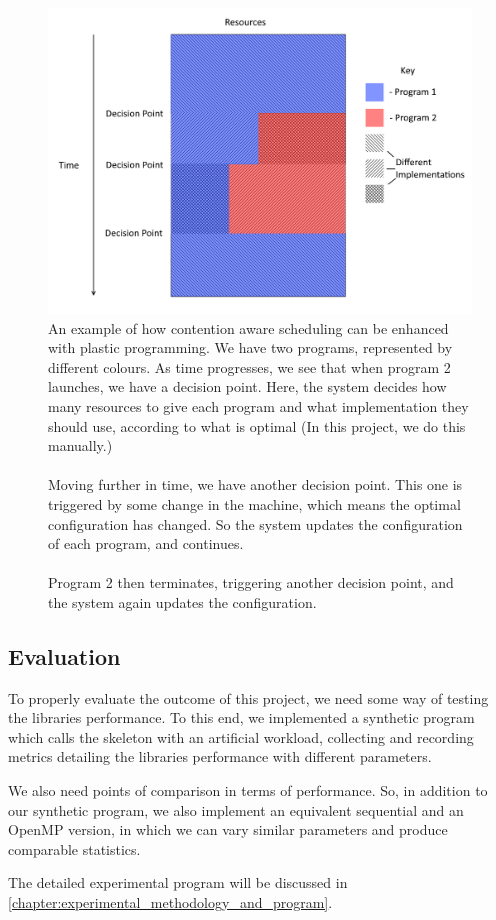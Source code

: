 \begin{figure}
	\centering
	\includegraphics[width=\textwidth]{graphics/plastic_contention_aware_scheduling.png}
	\caption{An example of how contention aware scheduling can be enhanced with plastic programming. We have two programs, represented by different colours. As time progresses, we see that when program 2 launches, we have a decision point. Here, the system decides how many resources to give each program and what implementation they should use, according to what is optimal (In this project, we do this manually.) \\ \\ Moving further in time, we have another decision point. This one is triggered by some change in the machine, which means the optimal configuration has changed. So the system updates the configuration of each program, and continues. \\ \\ Program 2 then terminates, triggering another decision point, and the system again updates the configuration.}
	\label{fig:plastic_contention_aware_scheduling}
\end{figure}



\subsection{Evaluation}

To properly evaluate the outcome of this project, we need some way of testing the libraries performance. To this end, we implemented a synthetic program which calls the skeleton with an artificial workload, collecting and recording metrics detailing the libraries performance with different parameters.  

We also need points of comparison in terms of performance. So, in addition to our synthetic program, we also implement an equivalent sequential and an OpenMP version, in which we can vary similar parameters and produce comparable statistics. 

The detailed experimental program will be discussed in \ref{chapter:experimental_methodology_and_program}.